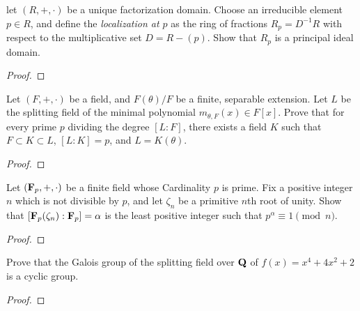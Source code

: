 \begin{problem}
let $(R,+,\cdot)$ be a unique factorization domain. Choose an irreducible
element $p\in R$, and define the \emph{localization at $p$} as the ring of
fractions $R_p=D^{-1}R$ with respect to the multiplicative set
$D=R-(p)$. Show that $R_p$ is a principal ideal domain.
\end{problem}
\begin{proof}
\end{proof}

\begin{problem}
Let $(F,+,\cdot)$ be a field, and $F(\theta)/F$ be a finite, separable
extension. Let $L$ be the splitting field of the minimal polynomial
$m_{\theta,F}(x)\in F[x]$. Prove that for every prime $p$ dividing the
degree $[L:F]$, there exists a field $K$ such that $F\subset K\subset L$,
$[L:K]=p$, and $L=K(\theta)$.
\end{problem}
\begin{proof}
\end{proof}

\begin{problem}
Let $(\mathbf{F}_p,+,\cdot)$ be a finite field whose Cardinality $p$ is
prime. Fix a positive integer $n$ which is not divisible by $p$, and let
$\zeta_n$ be a primitive $n$th root of unity. Show that
$\left[\mathbf{F}_p(\zeta_n):\mathbf{F}_p\right]=\alpha$  is the least positive integer
such that $p^\alpha\equiv 1\pmod{n}$.
\end{problem}
\begin{proof}
\end{proof}

\begin{problem}
Prove that the Galois group of the splitting field over $\mathbf{Q}$ of
$f(x)=x^4+4x^2+2$ is a cyclic group.
\end{problem}
\begin{proof}
\end{proof}

